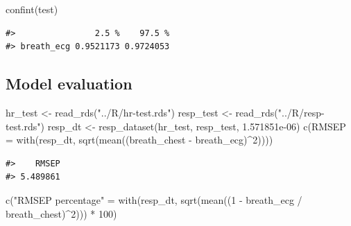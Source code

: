 \documentclass[
]{article}
\newenvironment{Shaded}{\begin{snugshade}}{\end{snugshade}}
\newcommand{\AttributeTok}[1]{\textcolor[rgb]{0.77,0.63,0.00}{#1}}
\newcommand{\DecValTok}[1]{\textcolor[rgb]{0.00,0.00,0.81}{#1}}
\newcommand{\FloatTok}[1]{\textcolor[rgb]{0.00,0.00,0.81}{#1}}
\newcommand{\FunctionTok}[1]{\textcolor[rgb]{0.00,0.00,0.00}{#1}}
\newcommand{\NormalTok}[1]{#1}
\newcommand{\OtherTok}[1]{\textcolor[rgb]{0.56,0.35,0.01}{#1}}
\newcommand{\SpecialCharTok}[1]{\textcolor[rgb]{0.00,0.00,0.00}{#1}}
\newcommand{\StringTok}[1]{\textcolor[rgb]{0.31,0.60,0.02}{#1}}
\begin{document}
\begin{Shaded}
\begin{Highlighting}[]
\FunctionTok{confint}\NormalTok{(test)}
\end{Highlighting}
\end{Shaded}

\begin{verbatim}
#>                2.5 %    97.5 %
#> breath_ecg 0.9521173 0.9724053
\end{verbatim}

\hypertarget{model-evaluation-1}{%
\subsection{Model evaluation}\label{model-evaluation-1}}

\begin{Shaded}
\begin{Highlighting}[]
\NormalTok{hr\_test }\OtherTok{\textless{}{-}} \FunctionTok{read\_rds}\NormalTok{(}\StringTok{"../R/hr{-}test.rds"}\NormalTok{)}
\NormalTok{resp\_test }\OtherTok{\textless{}{-}} \FunctionTok{read\_rds}\NormalTok{(}\StringTok{"../R/resp{-}test.rds"}\NormalTok{)}
\NormalTok{resp\_dt }\OtherTok{\textless{}{-}} \FunctionTok{resp\_dataset}\NormalTok{(hr\_test, resp\_test, }\FloatTok{1.571851e{-}06}\NormalTok{)}
\FunctionTok{c}\NormalTok{(}\AttributeTok{RMSEP =} \FunctionTok{with}\NormalTok{(resp\_dt, }\FunctionTok{sqrt}\NormalTok{(}\FunctionTok{mean}\NormalTok{((breath\_chest }\SpecialCharTok{{-}}\NormalTok{ breath\_ecg)}\SpecialCharTok{\^{}}\DecValTok{2}\NormalTok{))))}
\end{Highlighting}
\end{Shaded}

\begin{verbatim}
#>    RMSEP 
#> 5.489861
\end{verbatim}

\begin{Shaded}
\begin{Highlighting}[]
\FunctionTok{c}\NormalTok{(}\StringTok{"RMSEP percentage"} \OtherTok{=} \FunctionTok{with}\NormalTok{(resp\_dt, }\FunctionTok{sqrt}\NormalTok{(}\FunctionTok{mean}\NormalTok{((}\DecValTok{1} \SpecialCharTok{{-}}
\NormalTok{  breath\_ecg }\SpecialCharTok{/}\NormalTok{ breath\_chest)}\SpecialCharTok{\^{}}\DecValTok{2}\NormalTok{))) }\SpecialCharTok{*} \DecValTok{100}\NormalTok{)}
\end{Highlighting}
\end{Shaded}
\end{document}
